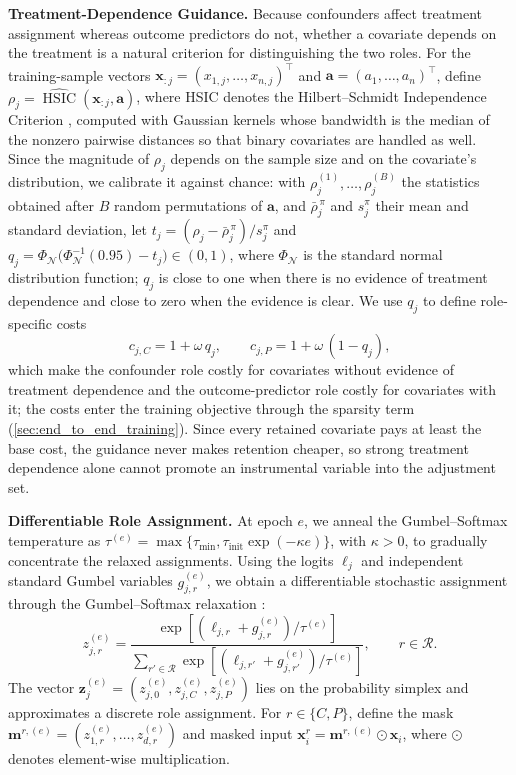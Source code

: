 \documentclass[twoside]{article}
\theoremstyle{plain}
\theoremstyle{definition}
\theoremstyle{remark}
\newtheorem{proof sketch}[theorem]{Proof Sketch}
\begin{document}
\textbf{Treatment-Dependence Guidance.}
Because confounders affect treatment assignment whereas outcome predictors do not, whether a covariate depends on the treatment is a natural criterion for distinguishing the two roles. For the training-sample vectors $\mathbf x_{:j}=(x_{1,j},\ldots,x_{n,j})^\top$ and $\mathbf a=(a_1,\ldots,a_n)^\top$, define $\rho_j=\widehat{\operatorname{HSIC}}(\mathbf x_{:j},\mathbf a)$, where HSIC denotes the Hilbert--Schmidt Independence Criterion \citep{gretton2005measuring,gretton2007kernel}, computed with Gaussian kernels whose bandwidth is the median of the nonzero pairwise distances so that binary covariates are handled as well. Since the magnitude of $\rho_j$ depends on the sample size and on the covariate's distribution, we calibrate it against chance: with $\rho_j^{(1)},\ldots,\rho_j^{(B)}$ the statistics obtained after $B$ random permutations of $\mathbf a$, and $\bar\rho_j^{\,\pi}$ and $s_j^{\pi}$ their mean and standard deviation, let $t_j=(\rho_j-\bar\rho_j^{\,\pi})/s_j^{\pi}$ and $q_j=\Phi_{\mathcal N}\bigl(\Phi_{\mathcal N}^{-1}(0.95)-t_j\bigr)\in(0,1)$, where $\Phi_{\mathcal N}$ is the standard normal distribution function; $q_j$ is close to one when there is no evidence of treatment dependence and close to zero when the evidence is clear. We use $q_j$ to define role-specific costs
\begin{equation}
\label{Eq7}
c_{j,C}=1+\omega\,q_j,\qquad c_{j,P}=1+\omega\,(1-q_j),
\end{equation}
which make the confounder role costly for covariates without evidence of treatment dependence and the outcome-predictor role costly for covariates with it; the costs enter the training objective through the sparsity term (\cref{sec:end_to_end_training}). Since every retained covariate pays at least the base cost, the guidance never makes retention cheaper, so strong treatment dependence alone cannot promote an instrumental variable into the adjustment set.

\textbf{Differentiable Role Assignment.}
At epoch $e$, we anneal the Gumbel--Softmax temperature as $\tau^{(e)}=\max\{\tau_{\min},\tau_{\mathrm{init}}\exp(-\kappa e)\}$, with $\kappa>0$, to gradually concentrate the relaxed assignments. Using the logits $\boldsymbol{\ell}_j$  and independent standard Gumbel variables $g_{j,r}^{(e)}$, we obtain a differentiable stochastic assignment through the Gumbel--Softmax relaxation \citep{jang2017categorical,maddison2017concrete}:
\[
z_{j,r}^{(e)}
=
\frac{\exp[({\ell}_{j,r}+g_{j,r}^{(e)})/\tau^{(e)}]}
{\sum_{r'\in\mathcal R}\exp[({\ell}_{j,r'}+g_{j,r'}^{(e)})/\tau^{(e)}]},
\qquad r\in\mathcal R.
\]
The vector $\boldsymbol{z}_j^{(e)}=(z_{j,0}^{(e)},z_{j,C}^{(e)},z_{j,P}^{(e)})$ lies on the probability simplex and approximates a discrete role assignment.
For $r\in\{C,P\}$, define the mask $\mathbf m^{r,(e)}=(z_{1,r}^{(e)},\ldots,z_{d,r}^{(e)})$ and masked input $\mathbf x_i^r=\mathbf m^{r,(e)}\odot\mathbf x_i$, where $\odot$ denotes element-wise multiplication.
\end{document}
